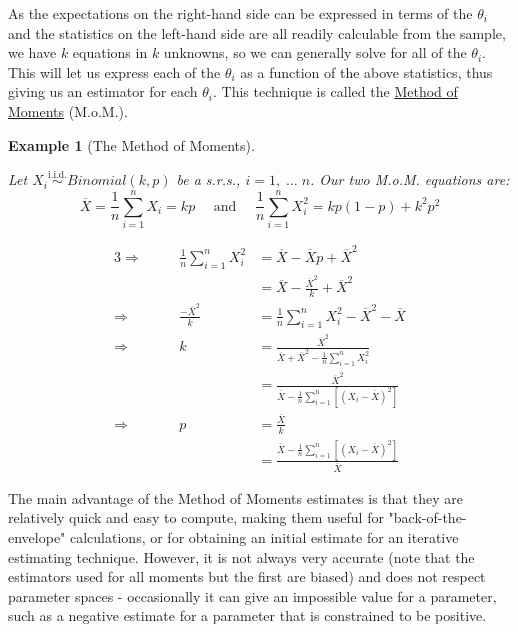 \documentclass[12pt,a4paper]{article}
\newtheorem{ex}[thm]{Example}
\begin{document}
As the expectations on the right-hand side can be expressed in terms of the $\theta_i$ and the statistics on the left-hand side are all readily calculable from the sample, we have $k$ equations in $k$ unknowns, so we can generally solve for all of the $\theta_i$. This will let us express each of the $\theta_i$ as a function of the above statistics, thus giving us an estimator for each $\theta_i$. This technique is called the \underline{Method of Moments} (M.o.M.).

\begin{ex}[The Method of Moments]$\;$\par\vspace{1cm}

Let $X_i \overset{\text{i.i.d.}}{\sim} Binomial(k,p)$ be a s.r.s., $i = 1,\;\hdots\;n$. Our two M.o.M. equations are:
$$\overline{X}=\frac{1}{n}\sum_{i=1}^n X_i = kp \quad\mbox{ and }\quad \frac{1}{n}\sum_{i=1}^n X_i^2 = kp(1-p) + k^2p^2$$

\begin{alignat*}{3}
\Rightarrow\quad & & \frac{1}{n} \sum_{i=1}^n X_i^2 &= \overline{X} - \overline{X}p + \overline{X}^2\\
& & &= \overline{X} - \frac{\overline{X}^2}{k} + \overline{X}^2\\
\Rightarrow \quad & & \frac{-\overline{X}^2}{k} &= \frac{1}{n}\sum_{i=1}^n X_i^2 - \overline{X}^2 - \overline{X}\\
\Rightarrow\quad & & k &= \frac{\overline{X}^2}{\overline{X}+\overline{X}^2 - \frac{1}{n}\sum\limits_{i=1}^n X_i^2}\\
& & &= \frac{\overline{X}^2}{\overline{X} - \frac{1}{n}\sum\limits_{i=1}^n \left[(X_i - \overline{X})^2\right]}\\
\Rightarrow\quad &  & p &= \frac{\overline{X}}{k}\\
& & &= \frac{\overline{X} - \frac{1}{n}\sum\limits_{i=1}^n \left[(X_i - \overline{X})^2\right]}{\overline{X}}
\end{alignat*}

\end{ex}

The main advantage of the Method of Moments estimates is that they are relatively quick and easy to compute, making them useful for "back-of-the-envelope" calculations, or for obtaining an initial estimate for an iterative estimating technique. However, it is not always very accurate (note that the estimators used for all moments but the first are biased) and does not respect parameter spaces - occasionally it can give an impossible value for a parameter, such as a negative estimate for a parameter that is constrained to be positive.
\end{document}
